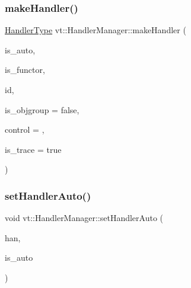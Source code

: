 \mbox{\label{structvt_1_1_handler_manager_adfeeb7560bf9cd5fda887fdf11902f4e}} 
\subsubsection{\texorpdfstring{make\+Handler()}{makeHandler()}}
{\footnotesize\ttfamily \hyperlink{namespacevt_af64846b57dfcaf104da3ef6967917573}{Handler\+Type} vt\+::\+Handler\+Manager\+::make\+Handler (\begin{DoxyParamCaption}\item[{bool}]{is\+\_\+auto,  }\item[{bool}]{is\+\_\+functor,  }\item[{\hyperlink{namespacevt_a59ae068fe828d1c33051ff96f3d016b6}{Handler\+Identifier\+Type}}]{id,  }\item[{bool}]{is\+\_\+objgroup = {\ttfamily false},  }\item[{\hyperlink{namespacevt_adbbef13b92f0a93b14c219b7cc8a48f2}{Handler\+Control\+Type}}]{control = {},  }\item[{bool}]{is\+\_\+trace = {\ttfamily true} }\end{DoxyParamCaption})\hspace{0.3cm}{\ttfamily [static]}}

\mbox{\label{structvt_1_1_handler_manager_a9100f9e0e946b58d98d104a5cbcf5574}} 
\subsubsection{\texorpdfstring{set\+Handler\+Auto()}{setHandlerAuto()}}
{\footnotesize\ttfamily void vt\+::\+Handler\+Manager\+::set\+Handler\+Auto (\begin{DoxyParamCaption}\item[{\hyperlink{namespacevt_af64846b57dfcaf104da3ef6967917573}{Handler\+Type} \&}]{han,  }\item[{bool}]{is\+\_\+auto }\end{DoxyParamCaption})\hspace{0.3cm}{\ttfamily [static]}}

